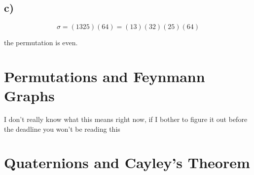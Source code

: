 \documentclass[]{scrartcl}
\begin{document}
\subsection{c)}

$$
\sigma = (1325)(64) = (13) (32) (25) (64)
$$

the permutation is even.

\section{Permutations and Feynmann Graphs}

I don't really know what this means right now, if I bother to figure it out before the deadline you won't be reading this

\section{Quaternions and Cayley's Theorem}
\end{document}
